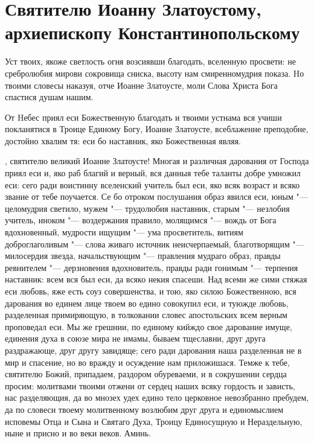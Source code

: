 \section{Святителю Иоанну Златоустому, архиепископу Константинопольскому}\begin{mymulticols}


Уст твоих, якоже светлость огня возсиявши благодать, вселенную просвети: не сребролюбия мирови сокровища сниска, высоту нам смиренномудрия показа. Hо твоими словесы наказуя, отче Иоанне Златоусте, моли Слова Христа Бога спастися душам нашим.


От Hебес приял еси Божественную благодать и твоими устнама вся учиши покланятися в Троице Единому Богу, Иоанне Златоусте, всеблаженне преподобне, достойно хвалим тя: еси бо наставник, яко Божественная являя.


{, святителю великий Иоанне Златоусте! Многая и различная дарования от Господа приял еси и, яко раб благий и верный, вся данныя тебе таланты добре умножил еси: сего ради воистинну вселенский учитель был еси, яко всяк возраст и всяко звание от тебе поучается. Се бо отроком послушания образ явился еси, юным "--- целомудрия светило, мужем "--- трудолюбия наставник, старым "--- незлобия учитель, иноком "--- воздержания правило, молящимся "--- вождь от Бога вдохновенный, мудрости ищущим "--- ума просветитель, витиям доброглаголивым "--- слова живаго источник неисчерпаемый, благотворящим "--- милосердия звезда, начальствующим "--- правления мудраго образ, правды ревнителем "--- дерзновения вдохновитель, правды ради гонимым "--- терпения наставник: всем вся был еси, да всяко некия спасеши. Над всеми же сими стяжая еси любовь, яже есть соуз совершенства, и тою, яко силою Божественною, вся дарования во единем лице твоем во едино совокупил еси, и туюжде любовь, разделенная примиряющую, в толковании словес апостольских всем верным проповедал еси. Мы же грешнии, по единому кийждо свое дарование имуще, единения духа в союзе мира не имамы, бываем тщеславни, друг друга раздражающе, друг другу завидяще; сего ради дарования наша разделенная не в мир и спасение, но во вражду и осуждение нам приложишася. Темже к тебе, святителю Божий, припадаем, раздором обуреваеми, и в сокрушении сердца просим: молитвами твоими отжени от сердец наших всяку гордость и зависть, нас разделяющия, да во мнозех удех едино тело церковное невозбранно пребудем, да по словеси твоему молитвенному возлюбим друг друга и единомыслием исповемы Отца и Сына и Святаго Духа, Троицу Единосущную и Нераздельную, ныне и присно и во веки веков. Аминь.}

\end{mymulticols}

